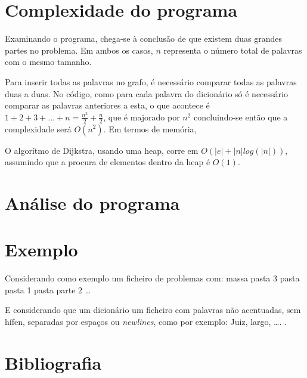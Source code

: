\documentclass[a4paper, 11pt]{article}
\begin{document}
\section{Complexidade do programa}
    \par Examinando o programa, chega-se à conclusão de que existem duas grandes partes no problema. Em ambos os casos, $n$ representa o número total de palavras com o mesmo tamanho.
    \begin{description}[align=left]
        \item[Criação de grafo] Para inserir todas as palavras no grafo, é necessário comparar todas as palavras duas a duas. No código, como para cada palavra do dicionário só é necessário comparar as palavras anteriores a esta, o que acontece é $1 + 2 + 3 + ... + n = \frac{n^2}{2} + \frac{n}{2}$, que é majorado por $n^2$ concluindo-se então que a complexidade será $O(n^2)$.
        Em termos de memória, 
        \item[Algorítmo de Dijkstra] O algorítmo de Dijkstra, usando uma heap, corre em $O(|e| + |n|log(|n|))$, assumindo que a procura de elementos dentro da heap é $O(1)$.
    \end{description}

\section{Análise do programa}

\section{Exemplo}
    \par Considerando como exemplo um ficheiro de problemas com:
        massa pasta 3
        pasta pasta 1
        pasta parte 2
        …
    \par E considerando que um dicionário um ficheiro com palavras não acentuadas, sem hífen, separadas por espaços ou \textit{newlines}, como por exemplo: 
        Juiz, largo, …. .

\section{Bibliografia}
\end{document}
